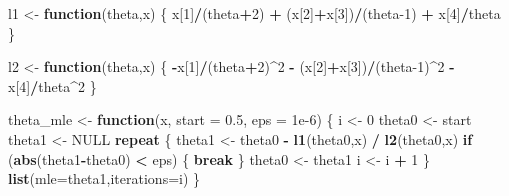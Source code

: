 \documentclass[
]{article}
\newenvironment{Shaded}{\begin{snugshade}}{\end{snugshade}}
\newcommand{\AttributeTok}[1]{\textcolor[rgb]{0.13,0.29,0.53}{#1}}
\newcommand{\ConstantTok}[1]{\textcolor[rgb]{0.56,0.35,0.01}{#1}}
\newcommand{\ControlFlowTok}[1]{\textcolor[rgb]{0.13,0.29,0.53}{\textbf{#1}}}
\newcommand{\DecValTok}[1]{\textcolor[rgb]{0.00,0.00,0.81}{#1}}
\newcommand{\FloatTok}[1]{\textcolor[rgb]{0.00,0.00,0.81}{#1}}
\newcommand{\FunctionTok}[1]{\textcolor[rgb]{0.13,0.29,0.53}{\textbf{#1}}}
\newcommand{\NormalTok}[1]{#1}
\newcommand{\OtherTok}[1]{\textcolor[rgb]{0.56,0.35,0.01}{#1}}
\newcommand{\SpecialCharTok}[1]{\textcolor[rgb]{0.81,0.36,0.00}{\textbf{#1}}}
\begin{document}
\begin{Shaded}
\begin{Highlighting}[]
\NormalTok{l1 }\OtherTok{\textless{}{-}} \ControlFlowTok{function}\NormalTok{(theta,x)}
\NormalTok{\{}
\NormalTok{  x[}\DecValTok{1}\NormalTok{]}\SpecialCharTok{/}\NormalTok{(theta}\SpecialCharTok{+}\DecValTok{2}\NormalTok{) }\SpecialCharTok{+}\NormalTok{ (x[}\DecValTok{2}\NormalTok{]}\SpecialCharTok{+}\NormalTok{x[}\DecValTok{3}\NormalTok{])}\SpecialCharTok{/}\NormalTok{(theta}\DecValTok{{-}1}\NormalTok{) }\SpecialCharTok{+}\NormalTok{ x[}\DecValTok{4}\NormalTok{]}\SpecialCharTok{/}\NormalTok{theta}
\NormalTok{\}}

\NormalTok{l2 }\OtherTok{\textless{}{-}} \ControlFlowTok{function}\NormalTok{(theta,x)}
\NormalTok{\{}
  \SpecialCharTok{{-}}\NormalTok{x[}\DecValTok{1}\NormalTok{]}\SpecialCharTok{/}\NormalTok{(theta}\SpecialCharTok{+}\DecValTok{2}\NormalTok{)}\SpecialCharTok{\^{}}\DecValTok{2} \SpecialCharTok{{-}}\NormalTok{ (x[}\DecValTok{2}\NormalTok{]}\SpecialCharTok{+}\NormalTok{x[}\DecValTok{3}\NormalTok{])}\SpecialCharTok{/}\NormalTok{(theta}\DecValTok{{-}1}\NormalTok{)}\SpecialCharTok{\^{}}\DecValTok{2} \SpecialCharTok{{-}}\NormalTok{ x[}\DecValTok{4}\NormalTok{]}\SpecialCharTok{/}\NormalTok{theta}\SpecialCharTok{\^{}}\DecValTok{2}
\NormalTok{\}}

\NormalTok{theta\_mle }\OtherTok{\textless{}{-}} \ControlFlowTok{function}\NormalTok{(x, }\AttributeTok{start =} \FloatTok{0.5}\NormalTok{, }\AttributeTok{eps =} \FloatTok{1e{-}6}\NormalTok{)}
\NormalTok{\{}
\NormalTok{  i }\OtherTok{\textless{}{-}} \DecValTok{0}
\NormalTok{  theta0 }\OtherTok{\textless{}{-}}\NormalTok{ start}
\NormalTok{  theta1 }\OtherTok{\textless{}{-}} \ConstantTok{NULL}
  \ControlFlowTok{repeat}
\NormalTok{  \{}
\NormalTok{    theta1 }\OtherTok{\textless{}{-}}\NormalTok{ theta0 }\SpecialCharTok{{-}} \FunctionTok{l1}\NormalTok{(theta0,x) }\SpecialCharTok{/} \FunctionTok{l2}\NormalTok{(theta0,x)}
    \ControlFlowTok{if}\NormalTok{ (}\FunctionTok{abs}\NormalTok{(theta1}\SpecialCharTok{{-}}\NormalTok{theta0) }\SpecialCharTok{\textless{}}\NormalTok{ eps) \{ }\ControlFlowTok{break}\NormalTok{ \}}
\NormalTok{    theta0 }\OtherTok{\textless{}{-}}\NormalTok{ theta1}
\NormalTok{    i }\OtherTok{\textless{}{-}}\NormalTok{ i }\SpecialCharTok{+} \DecValTok{1}
\NormalTok{  \}}
  \FunctionTok{list}\NormalTok{(}\AttributeTok{mle=}\NormalTok{theta1,}\AttributeTok{iterations=}\NormalTok{i)}
\NormalTok{\}}
\end{Highlighting}
\end{Shaded}
\end{document}
